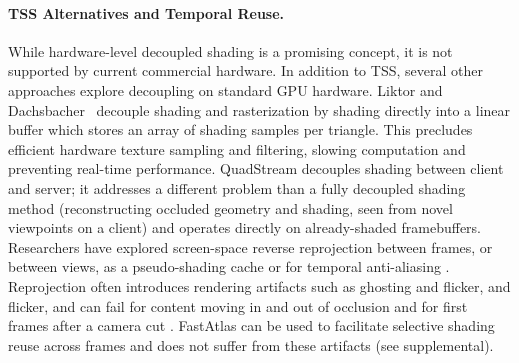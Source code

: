 \paragraph*{TSS Alternatives and Temporal Reuse.}
While hardware-level decoupled shading \cite{ragan2011decoupled, burns2010lazy,clarberg2013sort} is a promising concept, it is not supported by current commercial hardware. 
In addition to TSS, several other approaches explore decoupling on standard GPU hardware.
Liktor and Dachsbacher~ decouple shading and rasterization by shading directly into a linear buffer which stores an array of shading samples per triangle. This precludes efficient hardware texture sampling and filtering, slowing computation and preventing real-time performance. QuadStream \cite{hladky2022quadstream} decouples shading between client and server; it addresses a different problem than a fully decoupled shading method (reconstructing occluded geometry and shading, seen from novel viewpoints on a client) and operates directly on already-shaded framebuffers.
Researchers have explored screen-space reverse reprojection between frames, or between views, as a pseudo-shading cache \cite{nehab2007accelerating} or for temporal anti-aliasing \cite{karis2014hqaa, Yang2020TAA}.  Reprojection often introduces rendering artifacts such as ghosting and flicker, and flicker, and can fail for content moving in and out of occlusion and for first frames after a camera cut \cite{Scherzer11asurvey}. FastAtlas can be used to facilitate selective shading reuse across frames and does not suffer from these artifacts (see supplemental).
